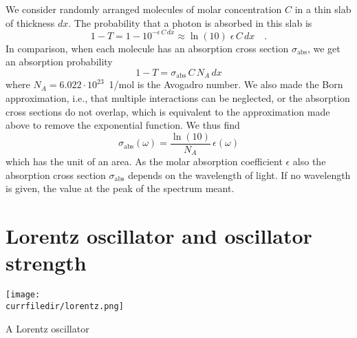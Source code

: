 We consider randomly arranged molecules of molar concentration $C$ in a thin slab of thickness $dx$. The probability that a photon is absorbed in this slab is
\[
 1 - T =1 -  10^{- \epsilon\, C \, dx} \approx \ln (10) \; \epsilon\, C \, dx \quad .
\]
In comparison, when each molecule has an absorption cross section $\sigma_{\text{abs}}$, we get an absorption probability 
\[
 1 - T = \sigma_{\text{abs}} \, C \, N_A \, dx
\]
where $N_A = 6.022 \cdot 10^{23}$~{1/mol} is the Avogadro number.  We also made the Born approximation, i.e., that multiple interactions can be neglected, or the absorption cross sections do not overlap, which is equivalent to the approximation made above to remove the exponential function.  We thus find
\[
 \sigma_{\text{abs}}(\omega) =  \frac{\ln(10)}{ N_A } \, \epsilon(\omega)
\]
which has the unit of an area. As the  molar absorption coefficient $\epsilon$  also the absorption cross section $\sigma_{\text{abs}}$ depends on the wavelength of light. If no wavelength is given, the value at the peak of the spectrum meant.


\section{Lorentz oscillator and oscillator strength}


\begin{marginfigure}
\texttt{[image: \\currfiledir/lorentz.png]}
\caption{A Lorentz oscillator}
\end{marginfigure}


